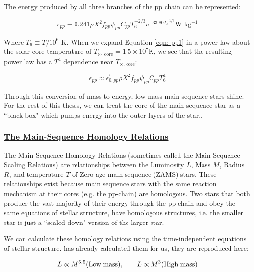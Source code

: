 \documentclass[12pt]{article} %
\numberwithin{equation}{section} %
\begin{document}
The energy produced by all three branches of the pp chain can be represented:

\begin{equation} \label{eqn: pp1}
\epsilon_{pp} = 0.241 \rho X^{2} f_{pp} \psi_{pp} C_{pp} T_{6}^{-2/3} e^{-33.80 T_{6}^{-1/3}} \text{W } \text{kg}^{-1}
\end{equation}

Where $T_{6} \equiv T / 10^{6}$ K. When we expand Equation \ref{eqn: pp1} in a power law about the solar core temperature of $T_{\odot \text{, core}} = 1.5 \times 10^{7}$K, we see that the resulting power law has a $T^{4}$ dependence near $T_{\odot \text{, core}}$:

\begin{equation} \label{eqn: pp2}
\epsilon_{pp} \approx \epsilon_{0, pp}^{'} \rho X^{2} f_{pp} \psi_{pp} C_{pp} T_{6}^{4}
\end{equation}

Through this conversion of mass to energy, low-mass main-sequence stars shine. For the rest of this thesis, we can treat the core of the main-sequence star as a ``black-box" which pumps energy into the outer layers of the star..

\subsubsection[The Main-Sequence Homology Relations]{\hyperlink{toc}{The Main-Sequence Homology Relations}} \label{sec: The Main-Sequence Homology Relations}

The Main-Sequence Homology Relations (sometimes called the Main-Sequence Scaling Relations) are relationships between the Luminosity $L$, Mass $M$, Radius $R$, and temperature $T$ of Zero-age main-sequence (ZAMS) stars. These relationships exist because main sequence stars with the same reaction mechanism at their cores (e.g. the pp-chain) are homologous. Two stars that both produce the vast majority of their energy through the pp-chain and obey the same equations of stellar structure, have homologous structures, i.e. the smaller star is just a ``scaled-down" version of the larger star.

We can calculate these homology relations using the time-independent equations of stellar structure. \citet{spineda2005homology} has already calculated them for us, they are reproduced here:

\begin{equation} \label{homology_L}
L \propto M^{5.5} \text{(Low mass)}, \qquad L \propto M^{3} \text{(High mass)}  \\
\end{equation}
\end{document}
